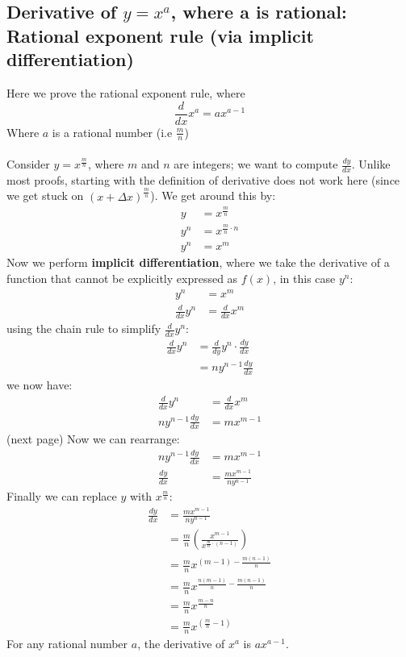 \documentclass{report}
\begin{document}
\subsection{Derivative of $y=x^a$, where a is rational: Rational exponent rule
(via implicit differentiation)} %
Here we prove the rational exponent rule, where
\begin{equation*}
\frac{d}{dx}x^a=ax^{a-1}
\end{equation*}
Where $a$ is a rational number (i.e $\frac{m}{n}$)\\
\vspace{2mm}\\
Consider $y=x^{\frac{m}{n}}$, where $m$ and $n$ are integers; we want to compute $\frac{dy}{dx}$.
Unlike most proofs, starting with the definition of derivative does not work here (since we 
get stuck on $(x+\Delta x)^{\frac{m}{n}}$). We get around this by:
\begin{align*}
y&=x^{\frac{m}{n}}\\
y^n&=x^{\frac{m}{n}\cdot n}\\
y^n&=x^m
\end{align*} 
Now we perform \textbf{implicit differentiation}, where we take the derivative of a function
that cannot be explicitly expressed as $f(x)$, in this case $y^n$:
\begin{align*}
y^n&=x^m\\
\frac{d}{dx}y^n&=\frac{d}{dx}x^m
\end{align*}
using the chain rule to simplify $\frac{d}{dx}y^n$:
\begin{align*}
\frac{d}{dx}y^n&=\frac{d}{dy}y^n\cdot\frac{dy}{dx}\\
&=ny^{n-1}\frac{dy}{dx}
\end{align*}
we now have:
\begin{align*}
\frac{d}{dx}y^n&=\frac{d}{dx}x^m\\
ny^{n-1}\frac{dy}{dx}&=mx^{m-1}
\end{align*}
(next page)
\newpage
\noindent Now we can rearrange:
\begin{align*}
ny^{n-1}\frac{dy}{dx}&=mx^{m-1}\\
\frac{dy}{dx}&=\frac{mx^{m-1}}{ny^{n-1}}
\end{align*}
Finally we can replace $y$ with $x^{\frac{m}{n}}$:
\begin{align*}
\frac{dy}{dx}&=\frac{mx^{m-1}}{ny^{n-1}}\\
&=\frac{m}{n}\left(\frac{x^{m-1}}{x^{\frac{m}{n}\cdot(n-1)}}\right)\\
&=\frac{m}{n}x^{(m-1)-\frac{m(n-1)}{n}}\\
&=\frac{m}{n}x^{\frac{n(m-1)}{n}-\frac{m(n-1)}{n}}\\
&=\frac{m}{n}x^{\frac{m-n}{n}}\\
&=\frac{m}{n}x^{(\frac{m}{n}-1)}
\end{align*}
For any rational number $a$, the derivative of $x^a$ is $ax^{a-1}$.
\newpage
\end{document}
